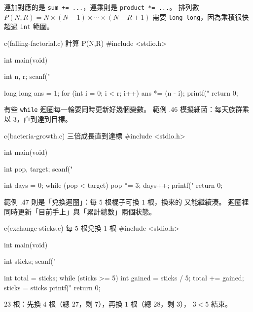 連加對應的是 \texttt{sum += ...}，連乘則是 \texttt{product *= ...}。
排列數 $P(N,R) = N \times (N-1) \times \cdots \times (N-R+1)$ 需要
\texttt{long long}，因為乘積很快超過 \texttt{int} 範圍。

\begin{example}{c}{(falling-factorial.c) 計算 P(N,R)}
#include <stdio.h>

int main(void) {
    int n, r;
    scanf("%

    long long ans = 1;
    for (int i = 0; i < r; i++) {
        ans *= (n - i);
    }
    printf("%
    return 0;
}
\end{example}


有些 \texttt{while} 迴圈每一輪要同時更新好幾個變數。 範例 \thechapter.46
模擬細菌：每天族群乘以 $3$，直到達到目標。

\begin{example}{c}{(bacteria-growth.c) 三倍成長直到達標}
#include <stdio.h>

int main(void) {
    int pop, target;
    scanf("%

    int days = 0;
    while (pop < target) {
        pop *= 3;
        days++;
    }
    printf("%
    return 0;
}
\end{example}


範例 \thechapter.47 則是「兌換迴圈」：每 $5$ 根棍子可換 $1$ 根，換來的
又能繼續湊。 迴圈裡同時更新「目前手上」與「累計總數」兩個狀態。

\begin{example}{c}{(exchange-sticks.c) 每 5 根兌換 1 根}
#include <stdio.h>

int main(void) {
    int sticks;
    scanf("%

    int total = sticks;
    while (sticks >= 5) {
        int gained = sticks / 5;
        total += gained;
        sticks = sticks %
    }
    printf("%
    return 0;
}
\end{example}


$23$ 根：先換 $4$ 根（總 $27$，剩 $7$），再換 $1$ 根（總 $28$，剩 $3$），
$3 < 5$ 結束。

